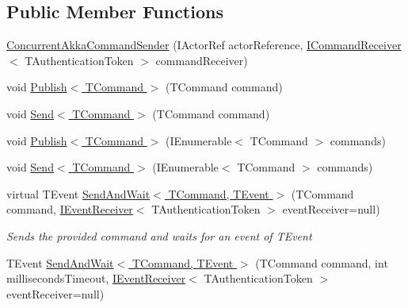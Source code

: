 \subsection*{Public Member Functions}
\begin{DoxyCompactItemize}
\item 
\hyperlink{classCqrs_1_1Akka_1_1Commands_1_1ConcurrentAkkaCommandSender_a203cd12567f100fb3545b029f6ed0181_a203cd12567f100fb3545b029f6ed0181}{Concurrent\+Akka\+Command\+Sender} (I\+Actor\+Ref actor\+Reference, \hyperlink{interfaceCqrs_1_1Commands_1_1ICommandReceiver}{I\+Command\+Receiver}$<$ T\+Authentication\+Token $>$ command\+Receiver)
\item 
void \hyperlink{classCqrs_1_1Akka_1_1Commands_1_1ConcurrentAkkaCommandSender_a5f65348c92377342ad8400eb6b40a2ac_a5f65348c92377342ad8400eb6b40a2ac}{Publish$<$ T\+Command $>$} (T\+Command command)
\item 
void \hyperlink{classCqrs_1_1Akka_1_1Commands_1_1ConcurrentAkkaCommandSender_a46b88bf730db4a530586737d699e1f12_a46b88bf730db4a530586737d699e1f12}{Send$<$ T\+Command $>$} (T\+Command command)
\item 
void \hyperlink{classCqrs_1_1Akka_1_1Commands_1_1ConcurrentAkkaCommandSender_a6505fbb31a885de31e68b2b87e969c31_a6505fbb31a885de31e68b2b87e969c31}{Publish$<$ T\+Command $>$} (I\+Enumerable$<$ T\+Command $>$ commands)
\item 
void \hyperlink{classCqrs_1_1Akka_1_1Commands_1_1ConcurrentAkkaCommandSender_a263a720c8c865bc246756307c0004aa6_a263a720c8c865bc246756307c0004aa6}{Send$<$ T\+Command $>$} (I\+Enumerable$<$ T\+Command $>$ commands)
\item 
virtual T\+Event \hyperlink{classCqrs_1_1Akka_1_1Commands_1_1ConcurrentAkkaCommandSender_a655aa63a47944035c113f9668bcf1284_a655aa63a47944035c113f9668bcf1284}{Send\+And\+Wait$<$ T\+Command, T\+Event $>$} (T\+Command command, \hyperlink{interfaceCqrs_1_1Events_1_1IEventReceiver}{I\+Event\+Receiver}$<$ T\+Authentication\+Token $>$ event\+Receiver=null)
\begin{DoxyCompactList}\small\item\em Sends the provided {\itshape command}  and waits for an event of {\itshape T\+Event}  \end{DoxyCompactList}\item 
T\+Event \hyperlink{classCqrs_1_1Akka_1_1Commands_1_1ConcurrentAkkaCommandSender_a171974eb1ba3eb7be9816bd7927227ac_a171974eb1ba3eb7be9816bd7927227ac}{Send\+And\+Wait$<$ T\+Command, T\+Event $>$} (T\+Command command, int milliseconds\+Timeout, \hyperlink{interfaceCqrs_1_1Events_1_1IEventReceiver}{I\+Event\+Receiver}$<$ T\+Authentication\+Token $>$ event\+Receiver=null)

\end{DoxyCompactItemize}
